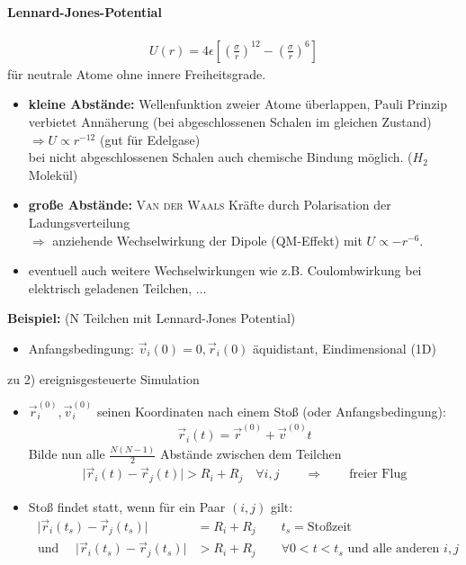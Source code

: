 \documentclass[12pt]{article}
\begin{document}
\paragraph{Lennard-Jones-Potential} 
\begin{align}
U(r) = 
4 \epsilon 
\left[ \left(  \frac{ \sigma }{r}  \right)^{12} - \left( \frac{\sigma }{r} \right)^6 \right]
\end{align}
für neutrale Atome ohne innere Freiheitsgrade. 
\begin{itemize}
\item \textbf{kleine Abstände:} Wellenfunktion zweier Atome überlappen,
 Pauli Prinzip verbietet Annäherung (bei abgeschlossenen Schalen im gleichen Zustand) \\ $\Rightarrow U \propto r^{-12}$ (gut für Edelgase) \\ bei nicht abgeschlossenen Schalen auch chemische Bindung möglich. ($H_2$ Molekül)
\item \textbf{große Abstände:} \textsc{Van der Waals} Kräfte durch Polarisation der Ladungsverteilung \\
$\Rightarrow$ anziehende Wechselwirkung der Dipole (QM-Effekt) mit $U \propto - r^{-6}$.
\item eventuell auch weitere Wechselwirkungen wie z.B. Coulombwirkung bei elektrisch geladenen Teilchen, ...
\end{itemize}
\textbf{Beispiel:} (N Teilchen mit Lennard-Jones Potential)
\begin{itemize}
\item Anfangsbedingung: $\vec{v}_i (0)=0, \vec{r}_i (0)$ äquidistant, Eindimensional (1D) 
\end{itemize} %
zu 2) ereignisgesteuerte Simulation
\begin{itemize}
\item $\vec{r}_i^{(0)}, \vec{v}_i^{(0)}$ seinen Koordinaten nach einem Stoß (oder Anfangsbedingung): 
\begin{align*}
\vec{r}_i (t) = \vec{r}^{(0)} + \vec{v}^{(0)} t
\end{align*} Bilde nun alle $\frac{N(N-1)}{2}$ Abstände zwischen dem Teilchen 
\begin{align*}
\vert \vec{r}_i (t) - \vec{r}_j (t) \vert > R_i + R_j \quad \forall i,j \qquad \Rightarrow \qquad  \text{freier Flug}
\end{align*}
\item Stoß findet statt, wenn für ein Paar $(i,j)$ gilt:
\begin{align*}
\; \vert \vec{r}_i (t_s) - \vec{r}_j (t_s) \vert &= R_i + R_j   \qquad t_s = \text{Stoßzeit} \\
\text{ und } \quad  \vert \vec{r}_i (t_s) - \vec{r}_j (t_s) \vert &> R_i + R_j \qquad \forall 0< t < t_s \text{ und alle anderen } i,j
\end{align*} 
\end{itemize}
\end{document}
